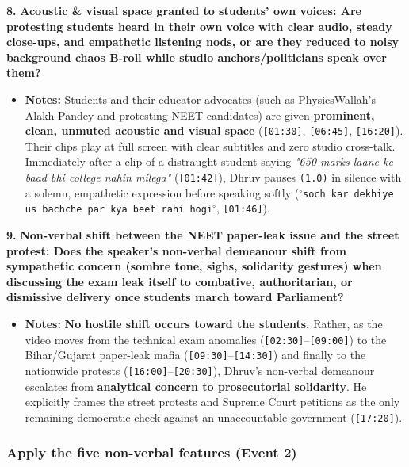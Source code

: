 \documentclass[10pt,a4paper]{article}
\begin{document}
\noindent\textbf{8.} \textbf{Acoustic \& visual space granted to students' own voices: Are protesting students heard in their own voice with clear audio, steady close-ups, and empathetic listening nods, or are they reduced to noisy background chaos B-roll while studio anchors/politicians speak over them?}\par\smallskip
\begin{itemize}
  \item \textbf{Notes:}
Students and their educator-advocates (such as PhysicsWallah's Alakh Pandey and protesting NEET candidates) are given \textbf{prominent, clean, unmuted acoustic and visual space} (\texttt{[01:30]}, \texttt{[06:45]}, \texttt{[16:20]}). Their clips play at full screen with clear subtitles and zero studio cross-talk. Immediately after a clip of a distraught student saying \textit{"650 marks laane ke baad bhi college nahin milega"} (\texttt{[01:42]}), Dhruv pauses \texttt{(1.0)} in silence with a solemn, empathetic expression before speaking softly (\texttt{$^\circ$soch kar dekhiye us bachche par kya beet rahi hogi$^\circ$}, \texttt{[01:46]}).\par\smallskip
\end{itemize}

\noindent\textbf{9.} \textbf{Non-verbal shift between the NEET paper-leak issue and the street protest: Does the speaker's non-verbal demeanour shift from sympathetic concern (sombre tone, sighs, solidarity gestures) when discussing the exam leak itself to combative, authoritarian, or dismissive delivery once students march toward Parliament?}\par\smallskip
\begin{itemize}
  \item \textbf{Notes:}
\textbf{No hostile shift occurs toward the students.} Rather, as the video moves from the technical exam anomalies (\texttt{[02:30]}--\texttt{[09:00]}) to the Bihar/Gujarat paper-leak mafia (\texttt{[09:30]}--\texttt{[14:30]}) and finally to the nationwide protests (\texttt{[16:00]}--\texttt{[20:30]}), Dhruv's non-verbal demeanour escalates from \textbf{analytical concern to prosecutorial solidarity}. He explicitly frames the street protests and Supreme Court petitions as the only remaining democratic check against an unaccountable government (\texttt{[17:20]}).\par\smallskip
\end{itemize}

\subsubsection*{Apply the five non-verbal features (Event 2)}
\end{document}
